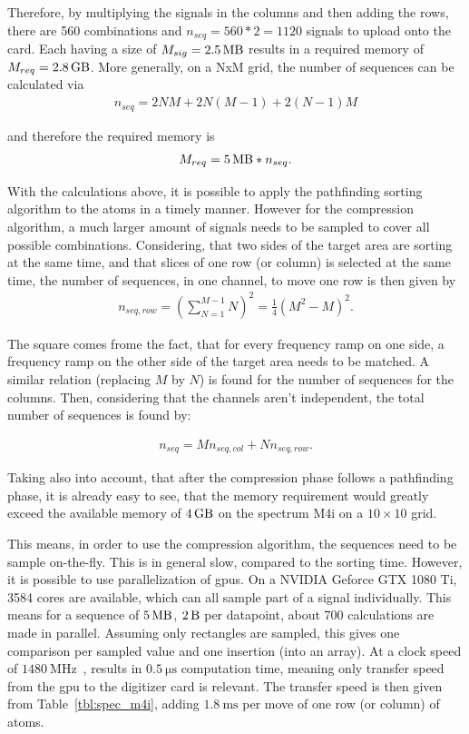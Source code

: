 Therefore, by multiplying the signals in the columns and then adding the rows, there are 560 combinations and $n_{seq} = 560*2=1120$ signals to upload onto the card. Each having a size of $M_{sig} = \SI{2.5}{\mega\byte}$ results in a required memory of $M_{req}=\SI{2.8}{\giga\byte}$. More generally, on a NxM grid, the number of sequences can be calculated via
\begin{align}
	n_{seq} = 2 N M + 2 N (M-1) + 2 (N-1) M
\end{align}

and therefore the required memory is
\begin{align}
	M_{req} = \SI{5}{\mega\byte} * n_{seq}.
\end{align}

With the calculations above, it is possible to apply the pathfinding sorting algorithm to the atoms in a timely manner. However for the compression algorithm, a much larger amount of signals needs to be sampled to cover all possible combinations. Considering, that two sides of the target area are sorting at the same time, and that slices of one row (or column) is selected at the same time, the number of sequences, in one channel, to move one row is then given by
\begin{align}
	n_{seq,row} = {\left(\sum_{N=1}^{M-1} N\right)}^2 = \frac{1}{4} {(M^2-M)}^2.
\end{align}

The square comes frome the fact, that for every frequency ramp on one side, a frequency ramp on the other side of the target area needs to be matched. A similar relation (replacing $M$ by $N$) is found for the number of sequences for the columns. Then, considering that the channels aren't independent, the total number of sequences is found by:

\begin{align}
	n_{seq} = M n_{seq,col} + N n_{seq,row}.
\end{align}

Taking also into account, that after the compression phase follows a pathfinding phase, it is already easy to see, that the memory requirement would greatly exceed the available memory of $\SI{4}{\giga\byte}$ on the spectrum M4i on a $10\times10$ grid.

This means, in order to use the compression algorithm, the sequences need to be sample on-the-fly. This is in general slow, compared to the sorting time. However, it is possible to use parallelization of \acp{gpu}. On a NVIDIA Geforce GTX 1080 Ti, 3584 cores are available, which can all sample part of a signal individually. This means for a sequence of $\SI{5}{\mega\byte}$, $\SI{2}{\byte}$ per datapoint, about 700 calculations are made in parallel. Assuming only rectangles are sampled, this gives one comparison per sampled value and one insertion (into an array). At a clock speed of $\SI{1480}{\mega\hertz}$~\cite{NVIDIA}, results in $\SI{0.5}{\micro\second}$ computation time, meaning only transfer speed from the \ac{gpu} to the digitizer card is relevant. The transfer speed is then given from Table~\ref{tbl:spec_m4i}, adding $\SI{1.8}{\milli\second}$ per move of one row (or column) of atoms.

